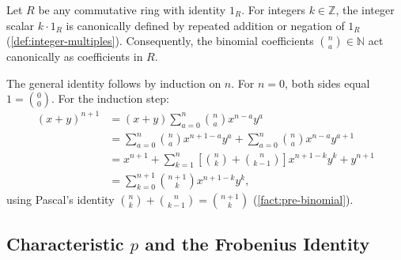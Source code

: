 \begin{content}
Let $R$ be any commutative ring with identity $1_R$. For integers $k \in \mathbb{Z}$, the integer scalar $k \cdot 1_R$ is canonically defined by repeated addition or negation of $1_R$ (\cref{def:integer-multiples}). Consequently, the binomial coefficients $\binom{n}{a} \in \mathbb{N}$ act canonically as coefficients in $R$.



\begin{steps}
The general identity follows by induction on $n$. For $n = 0$, both sides equal $1 = \binom{0}{0}$. For the induction step:
\begin{align*}
(x + y)^{n+1} &= (x + y) \sum_{a=0}^n \binom{n}{a} x^{n-a} y^a \\
&= \sum_{a=0}^n \binom{n}{a} x^{n+1-a} y^a + \sum_{a=0}^n \binom{n}{a} x^{n-a} y^{a+1} \\
&= x^{n+1} + \sum_{k=1}^n \left[ \binom{n}{k} + \binom{n}{k-1} \right] x^{n+1-k} y^k + y^{n+1} \\
&= \sum_{k=0}^{n+1} \binom{n+1}{k} x^{n+1-k} y^k,
\end{align*}
using Pascal's identity $\binom{n}{k} + \binom{n}{k-1} = \binom{n+1}{k}$ (\cref{fact:pre-binomial}).
\end{steps}
\end{content}

\subsection{Characteristic \texorpdfstring{$p$}{p} and the Frobenius Identity}

